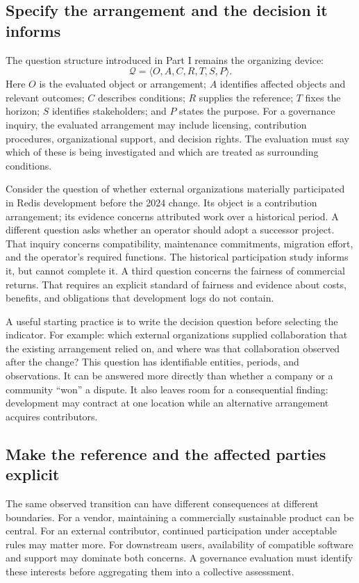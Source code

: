\subsection{Specify the arrangement and the decision it informs}
The question structure introduced in Part I remains the organizing device:
\[
\mathcal Q=\langle O,A,C,R,T,S,P\rangle.
\]
Here \(O\) is the evaluated object or arrangement; \(A\) identifies affected objects and relevant outcomes; \(C\) describes conditions; \(R\) supplies the reference; \(T\) fixes the horizon; \(S\) identifies stakeholders; and \(P\) states the purpose. For a governance inquiry, the evaluated arrangement may include licensing, contribution procedures, organizational support, and decision rights. The evaluation must say which of these is being investigated and which are treated as surrounding conditions.

Consider the question of whether external organizations materially participated in Redis development before the 2024 change. Its object is a contribution arrangement; its evidence concerns attributed work over a historical period. A different question asks whether an operator should adopt a successor project. That inquiry concerns compatibility, maintenance commitments, migration effort, and the operator's required functions. The historical participation study informs it, but cannot complete it. A third question concerns the fairness of commercial returns. That requires an explicit standard of fairness and evidence about costs, benefits, and obligations that development logs do not contain.

A useful starting practice is to write the decision question before selecting the indicator. For example: which external organizations supplied collaboration that the existing arrangement relied on, and where was that collaboration observed after the change? This question has identifiable entities, periods, and observations. It can be answered more directly than whether a company or a community ``won'' a dispute. It also leaves room for a consequential finding: development may contract at one location while an alternative arrangement acquires contributors.

\subsection{Make the reference and the affected parties explicit}
The same observed transition can have different consequences at different boundaries. For a vendor, maintaining a commercially sustainable product can be central. For an external contributor, continued participation under acceptable rules may matter more. For downstream users, availability of compatible software and support may dominate both concerns. A governance evaluation must identify these interests before aggregating them into a collective assessment.

